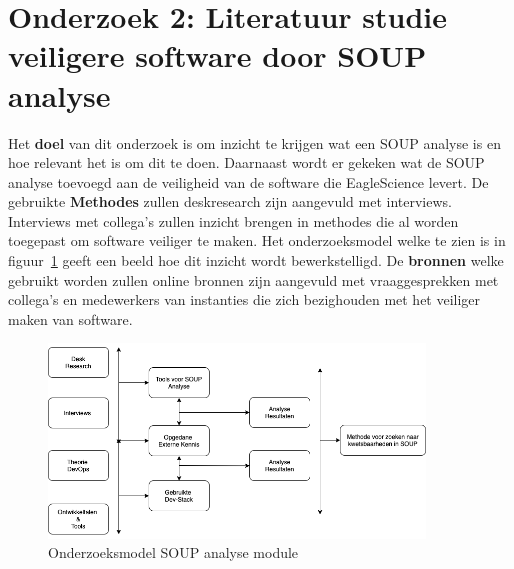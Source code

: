 \newpage %


\section{Onderzoek 2: Literatuur studie veiligere software door SOUP analyse}\label{sec:onderzoek:-literatuur-studie-soup}
Het \textbf{doel} van dit onderzoek is om inzicht te krijgen wat een SOUP analyse is en hoe relevant het is om dit te doen. Daarnaast wordt er gekeken wat de SOUP analyse toevoegd aan de veiligheid van de software die EagleScience levert. De gebruikte \textbf{Methodes} zullen deskresearch zijn aangevuld met interviews. Interviews met collega's zullen inzicht brengen in methodes die al worden toegepast om software veiliger te maken. Het onderzoeksmodel welke te zien is in figuur~\ref{fig:OnderzoeksModelNoodZaakSOUP} geeft een beeld hoe dit inzicht wordt bewerkstelligd. De \textbf{bronnen} welke gebruikt worden zullen online bronnen zijn aangevuld met vraaggesprekken met collega's en medewerkers van instanties die zich bezighouden met het veiliger maken van software.
\begin{figure}[htbp] %
    \myfloatalign
    \includegraphics[width=10cm]{gfx/OnderzoeksmodelSOUP}
    \caption{Onderzoeksmodel SOUP analyse module}
    \label{fig:OnderzoeksModelNoodZaakSOUP}
\end{figure}

%
%
%
%

